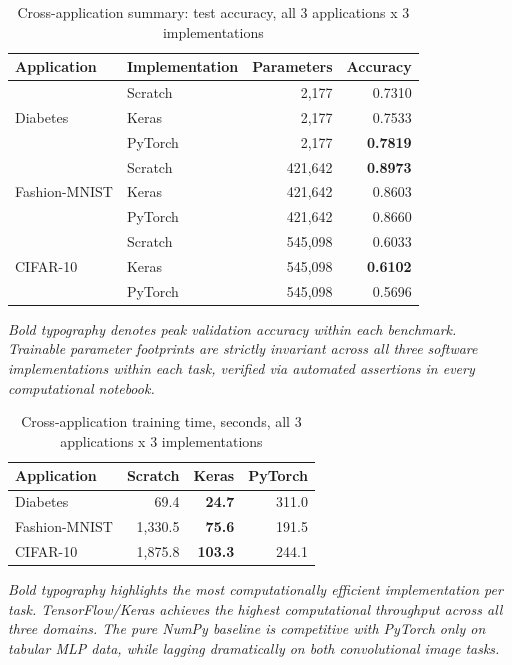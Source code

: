 \documentclass[11pt]{article}
\begin{document}
\begin{table}[H]
\centering
\caption{Cross-application summary: test accuracy, all 3 applications x 3 implementations}
\label{tab:cross-app}
\begin{tabular}{llrr}
\toprule
Application & Implementation & Parameters & Accuracy \\
\midrule
\multirow{3}{*}{Diabetes}
  & Scratch & 2,177 & 0.7310 \\
  & Keras & 2,177 & 0.7533 \\
  & PyTorch & 2,177 & \textbf{0.7819} \\
\midrule
\multirow{3}{*}{Fashion-MNIST}
  & Scratch & 421,642 & \textbf{0.8973} \\
  & Keras & 421,642 & 0.8603 \\
  & PyTorch & 421,642 & 0.8660 \\
\midrule
\multirow{3}{*}{CIFAR-10}
  & Scratch & 545,098 & 0.6033 \\
  & Keras & 545,098 & \textbf{0.6102} \\
  & PyTorch & 545,098 & 0.5696 \\
\bottomrule
\end{tabular}
\end{table}

\noindent\textit{Bold typography denotes peak validation accuracy within each benchmark. Trainable parameter footprints are strictly invariant across all three software implementations within each task, verified via automated assertions in every computational notebook.}

\begin{table}[H]
\centering
\caption{Cross-application training time, seconds, all 3 applications x 3 implementations}
\label{tab:cross-time}
\begin{tabular}{lrrr}
\toprule
Application & Scratch & Keras & PyTorch \\
\midrule
Diabetes & 69.4 & \textbf{24.7} & 311.0 \\
Fashion-MNIST & 1,330.5 & \textbf{75.6} & 191.5 \\
CIFAR-10 & 1,875.8 & \textbf{103.3} & 244.1 \\
\bottomrule
\end{tabular}
\end{table}

\noindent\textit{Bold typography highlights the most computationally efficient implementation per task. TensorFlow/Keras achieves the highest computational throughput across all three domains. The pure NumPy baseline is competitive with PyTorch only on tabular MLP data, while lagging dramatically on both convolutional image tasks.}
\end{document}

